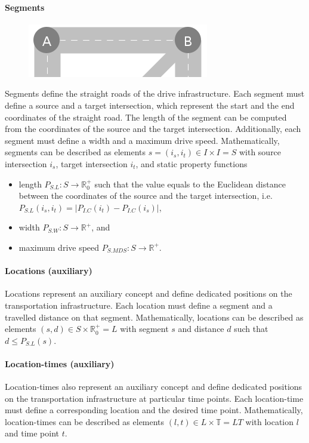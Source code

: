 \documentclass[graybox]{svmult}
\begin{document}
\paragraph{Segments}
\begin{figure}
	\centering
		\includegraphics[scale=0.4]{../../concepts/segment.png}
\end{figure}
Segments define the straight roads of the drive infrastructure.
Each segment must define a source and a target intersection, which represent the start and the end coordinates of the straight road.
The length of the segment can be computed from the coordinates of the source and the target intersection.
Additionally, each segment must define a width and a maximum drive speed.
Mathematically, segments can be described as elements $s = (i_s, i_t) \in I \times I = S$ with source intersection $i_s$, target intersection $i_t$, and static property functions
\begin{itemize}
	\item length $P_{S.L}: S \rightarrow \mathbb{R}_0^+$ such that the value equals to the Euclidean distance between the coordinates of the source and the target intersection, i.e.\ $P_{S.L}(i_s, i_t) = |P_{I.C}(i_t) - P_{I.C}(i_s)|$,
	\item width $P_{S.W}: S \rightarrow \mathbb{R}^+$, and
	\item maximum drive speed $P_{S.MDS}: S \rightarrow \mathbb{R}^+$.
\end{itemize}

\paragraph{Locations (auxiliary)}
Locations represent an auxiliary concept and define dedicated positions on the transportation infrastructure.
Each location must define a segment and a travelled distance on that segment.
Mathematically, locations can be described as elements $(s, d) \in S \times \mathbb{R}_0^+ = L$ with segment $s$ and distance $d$ such that $d \leq P_{S.L}(s)$.

\paragraph{Location-times (auxiliary)}
Location-times also represent an auxiliary concept and define dedicated positions on the transportation infrastructure at particular time points.
Each location-time must define a corresponding location and the desired time point.
Mathematically, location-times can be described as elements $(l, t) \in L \times \mathbb{T} = LT$ with location $l$ and time point $t$.
\end{document}
